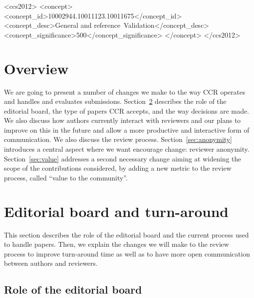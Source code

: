 \documentclass[sigconf]{acmart}
\begin{document}
    \begin{CCSXML}
	<ccs2012>
	<concept>
	<concept_id>10002944.10011123.10011675</concept_id>
	<concept_desc>General and reference~Validation</concept_desc>
	<concept_significance>500</concept_significance>
	</concept>
	</ccs2012>
\end{CCSXML}

        
    
    
    \maketitle

    \section{Overview}\label{sec:content}

We are going to present a number of changes we make to the way CCR operates and handles and evaluates submissions. Section~\ref{sec:board-time} describes the role of the editorial board, the type of papers CCR accepts, and the way decisions are made. We also discuss how authors currently interact with reviewers and our plans to improve on this in the future and allow a more productive and interactive form of communication. We also discuss the review process. Section~\ref{sec:anonymity} introduces a central aspect where we want encourage change: reviewer anonymity.  Section~\ref{sec:value} addresses a second necessary change aiming at widening the scope of the contributions considered, by adding a new metric to the review process, called ``value to the community''.

\section{Editorial board and turn-around}
\label{sec:board-time}
    
This section describes the role of the editorial board and the current process used to handle papers. Then, we explain the changes we will make to the review process to improve turn-around time as well as to have more open communication between authors and reviewers.

 \subsection{Role of the editorial board}
\label{subsec:board}
\end{document}
